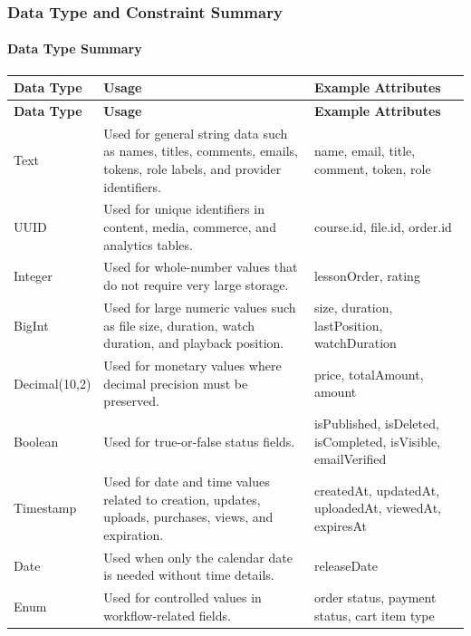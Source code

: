\subsubsection{Data Type and Constraint Summary}

\paragraph{Data Type Summary}
\begin{longtable}{L{2.5cm}L{7.1cm}L{4.1cm}}
\toprule
\textbf{Data Type} & \textbf{Usage} & \textbf{Example Attributes} \\
\midrule
\endfirsthead
\toprule
\textbf{Data Type} & \textbf{Usage} & \textbf{Example Attributes} \\
\midrule
\endhead
\bottomrule
\endfoot
Text & Used for general string data such as names, titles, comments, emails, tokens, role labels, and provider identifiers. & name, email, title, comment, token, role \\
UUID & Used for unique identifiers in content, media, commerce, and analytics tables. & course.id, file.id, order.id \\
Integer & Used for whole-number values that do not require very large storage. & lessonOrder, rating \\
BigInt & Used for large numeric values such as file size, duration, watch duration, and playback position. & size, duration, lastPosition, watchDuration \\
Decimal(10,2) & Used for monetary values where decimal precision must be preserved. & price, totalAmount, amount \\
Boolean & Used for true-or-false status fields. & isPublished, isDeleted, isCompleted, isVisible, emailVerified \\
Timestamp & Used for date and time values related to creation, updates, uploads, purchases, views, and expiration. & createdAt, updatedAt, uploadedAt, viewedAt, expiresAt \\
Date & Used when only the calendar date is needed without time details. & releaseDate \\
Enum & Used for controlled values in workflow-related fields. & order status, payment status, cart item type \\
\end{longtable}

